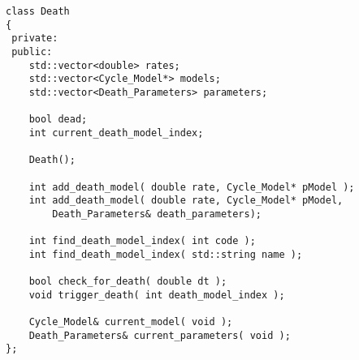 \documentclass[12pt]{article}
\begin{document}
\begin{verbatim}
class Death
{
 private:
 public:
    std::vector<double> rates; 
    std::vector<Cycle_Model*> models; 
    std::vector<Death_Parameters> parameters; 
    
    bool dead; 
    int current_death_model_index;
    
    Death();      
    
    int add_death_model( double rate, Cycle_Model* pModel );      
    int add_death_model( double rate, Cycle_Model* pModel, 
        Death_Parameters& death_parameters);      
    
    int find_death_model_index( int code );      
    int find_death_model_index( std::string name );      
    
    bool check_for_death( double dt );     
    void trigger_death( int death_model_index );      
    
    Cycle_Model& current_model( void );     
    Death_Parameters& current_parameters( void );      
};
\end{verbatim}
\end{document}
